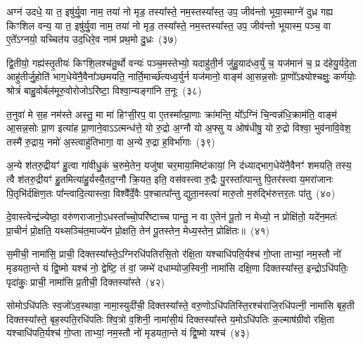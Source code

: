 {\anuvakamend[{श्यै॒त॒त्वं प्र॒तीच्या᳚ त्वा दि॒शा सा॑दयामि॒ यः सात्मा॑नञ्चिनु॒ते द्वाविꣳ॑शतिश्च}]}%

अग्न॑ उदधे॒ या त॒ इषु॑र्यु॒वा नाम॒ तया॑ नो मृड॒ तस्या᳚स्ते॒ नम॒स्तस्या᳚स्त॒ उप॒ जीव॑न्तो भूया॒स्माग्ने॑ दुध्र गह्य किꣳशिल वन्य॒ या त॒ इषु॑र्यु॒वा नाम॒ तया॑ नो मृड॒ तस्या᳚स्ते॒ नम॒स्तस्या᳚स्त॒ उप॒ जीव॑न्तो भूयास्म॒ पञ्च॒ वा ए॒ते᳚\-ऽग्नयो॒ यच्चित॑य उद॒धिरे॒व नाम॑ प्रथ॒मो दु॒ध्रः~(३७)

द्वि॒तीयो॒ गह्य॑स्तृ॒तीयः॑ किꣳशि॒लश्च॑तु॒र्थो वन्यः॑ पञ्च॒मस्तेभ्यो॒ यदाहु॑ती॒र्न जु॑हु॒याद॑ध्व॒र्युं च॒ यज॑मानं च॒ प्र द॑हेयु॒र्यदे॒ता आहु॑तीर्जु॒होति॑ भाग॒धेये॑नै॒वैना᳚ञ्छमयति॒ नार्ति॒मार्च्छ॑त्यध्व॒र्युर्न यज॑मानो॒ वाङ्म॑ आ॒सन्न॒सोः प्रा॒णो᳚\-ऽक्ष्योश्चक्षुः॒ कर्ण॑योः॒ श्रोत्रं॑ बाहु॒वोर्बल॑मूरु॒वोरोजो\-ऽरि॑ष्टा॒ विश्वा॒न्यङ्गा॑नि त॒नूः~(३८)

त॒नुवा॑ मे स॒ह नम॑स्ते अस्तु॒ मा मा॑ हिꣳसी॒रप॒ वा ए॒तस्मा᳚त्प्रा॒णाः क्रा॑मन्ति॒ यो᳚\-ऽग्निं चि॒न्वन्न॑धि॒क्राम॑ति॒ वाङ्म॑ आ॒सन्न॒सोः प्रा॒ण इत्या॑ह प्रा॒णाने॒वा\-ऽऽ\-त्मन्ध॑त्ते॒ यो रु॒द्रो अ॒ग्नौ यो अ॒फ्सु य ओष॑धीषु॒ यो रु॒द्रो विश्वा॒ भुव॑नावि॒वेश॒ तस्मै॑ रु॒द्राय॒ नमो॑ अ॒स्त्वाहु॑तिभागा॒ वा अ॒न्ये रु॒द्रा ह॒विर्भा॑गाः~(३९)

अ॒न्ये श॑तरु॒द्रीयꣳ॑ हु॒त्वा गा॑वीधु॒कं च॒रुमे॒तेन॒ यजु॑षा चर॒माया॒मिष्ट॑कायां॒ नि द॑ध्याद्भाग॒धेये॑नै॒वैनꣳ॑ शमयति॒ तस्य॒ त्वै श॑तरु॒द्रीयꣳ॑ हु॒तमित्या॑हु॒र्यस्यै॒तद॒ग्नौ क्रि॒यत॒ इति॒ वस॑वस्त्वा रु॒द्रैः पु॒रस्ता᳚त्पान्तु पि॒तर॑स्त्वा य॒मरा॑जानः पि॒तृभि॑र्दक्षिण॒तः पा᳚न्त्वादि॒त्यास्त्वा॒ विश्वै᳚र्दे॒वैः प॒श्चात्पा᳚न्तु द्युता॒नस्त्वा॑ मारु॒तो म॒रुद्भि॑रुत्तर॒तः पा॑तु~(४०)

दे॒वास्त्वेन्द्र॑ज्येष्ठा॒ वरु॑णराजानो॒\-ऽधस्ता᳚च्चो॒परि॑ष्टाच्च पान्तु॒ न वा ए॒तेन॑ पू॒तो न मेध्यो॒ न प्रोक्षि॑तो॒ यदे॑न॒मतः॑ प्रा॒चीनं॑ प्रो॒क्षति॒ यथ्सञ्चि॑त॒माज्ये॑न प्रो॒क्षति॒ तेन॑ पू॒तस्तेन॒ मेध्य॒स्तेन॒ प्रोक्षि॑तः॥~(४१)

{\anuvakamend[{दु॒ध्रस्त॒नूर्\mbox{}ह॒विर्भा॑गाः पातु॒ द्वात्रिꣳ॑शच्च}]}%

स॒मीची॒ नामा॑सि॒ प्राची॒ दिक्तस्या᳚स्ते॒\-ऽग्नि\-रधि॑\-पतिरसि॒तो र॑क्षि॒ता यश्चाधि॑\-पति॒र्यश्च॑ गो॒प्ता ताभ्यां॒ नम॒स्तौ नो॑ मृडयता॒न्ते यं द्वि॒ष्मो यश्च॑ नो॒ द्वेष्टि॒ तं वां॒ जम्भे॑ दधाम्योज॒स्विनी॒ नामा॑सि दक्षि॒णा दिक्तस्या᳚स्त॒ इन्द्रो\-ऽधि॑\-पतिः॒ पृदा॑कुः॒ प्राची॒ नामा॑सि प्र॒तीची॒ दिक्तस्या᳚स्ते~(४२)

सोमो\-ऽधि॑\-पतिः स्व॒जो॑\-ऽव॒स्थावा॒ नामा॒स्युदी॑ची॒ दिक्तस्या᳚स्ते॒ वरु॒णो\-ऽधि॑\-पतिस्ति॒रश्च॑राजि॒रधि॑पत्नी॒ नामा॑सि बृह॒ती दिक्तस्या᳚स्ते॒ बृह॒स्पति॒रधि॑\-पतिः श्वि॒त्रो व॒शिनी॒ नामा॑सी॒यं दिक्तस्या᳚स्ते य॒मो\-ऽधि॑\-पतिः क॒ल्माष॑ग्रीवो रक्षि॒ता यश्चाधि॑\-पति॒र्यश्च॑ गो॒प्ता ताभ्यां॒ नम॒स्तौ नो॑ मृडयता॒न्ते यं द्वि॒ष्मो यश्च॑~(४३)

